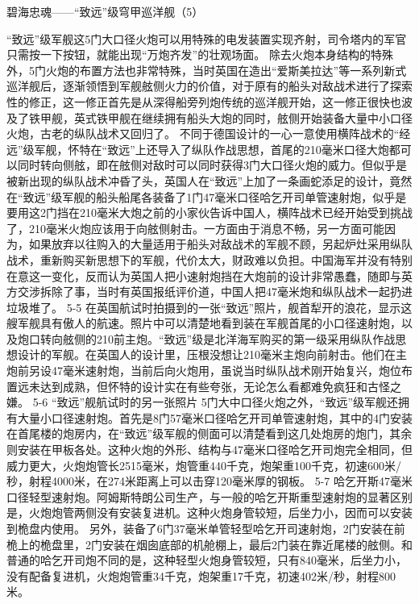 \documentclass[12pt,UTF8]{ctexbook}
\begin{document}
碧海忠魂——“致远”级穹甲巡洋舰（5）

“致远”级军舰这5门大口径火炮可以用特殊的电发装置实现齐射，司令塔内的军官只需按一下按钮，就能出现“万炮齐发”的壮观场面。 除去火炮本身结构的特殊外，5门火炮的布置方法也非常特殊，当时英国在造出“爱斯美拉达”等一系列新式巡洋舰后，逐渐领悟到军舰舷侧火力的价值，对于原有的船头对敌战术进行了探索性的修正，这一修正首先是从深得船旁列炮传统的巡洋舰开始，这一修正很快也波及了铁甲舰，英式铁甲舰在继续拥有船头大炮的同时，舷侧开始装备大量中小口径火炮，古老的纵队战术又回归了。
不同于德国设计的一心一意使用横阵战术的“经远”级军舰，怀特在“致远”上还导入了纵队作战思想，首尾的210毫米口径大炮都可以同时转向侧舷，即在舷侧对敌时可以同时获得3门大口径火炮的威力。但似乎是被新出现的纵队战术冲昏了头，英国人在“致远”上加了一条画蛇添足的设计，竟然在“致远”级军舰的船头船尾各装备了1门47毫米口径哈乞开司单管速射炮，似乎是要用这2门挡在210毫米大炮之前的小家伙告诉中国人，横阵战术已经开始受到挑战了，210毫米火炮应该用于向舷侧射击。一方面由于消息不畅，另一方面可能因为，如果放弃以往购入的大量适用于船头对敌战术的军舰不顾，另起炉灶采用纵队战术，重新购买新思想下的军舰，代价太大，财政难以负担。中国海军并没有特别在意这一变化，反而认为英国人把小速射炮挡在大炮前的设计非常愚蠢，随即与英方交涉拆除了事，当时有英国报纸评价道，中国人把47毫米炮和纵队战术一起扔进垃圾堆了。
5-5
在英国航试时拍摄到的一张“致远”照片，舰首犁开的浪花，显示这艘军舰具有傲人的航速。照片中可以清楚地看到装在军舰首尾的小口径速射炮，以及炮口转向舷侧的210前主炮。“致远”级是北洋海军购买的第一级采用纵队作战思想设计的军舰。在英国人的设计里，压根没想让210毫米主炮向前射击。他们在主炮前另设47毫米速射炮，当前后向火炮用，虽说当时纵队战术刚开始复兴，炮位布置远未达到成熟，但怀特的设计实在有些夸张，无论怎么看都难免疯狂和古怪之嫌。
5-6 “致远”舰航试时的另一张照片
5门大中口径火炮之外，“致远”级军舰还拥有大量小口径速射炮。首先是8门57毫米口径哈乞开司单管速射炮，其中的4门安装在首尾楼的炮房内，在“致远”级军舰的侧面可以清楚看到这几处炮房的炮门，其余则安装在甲板各处。这种火炮的外形、结构与47毫米口径哈乞开司炮完全相同，但威力更大，火炮炮管长2515毫米，炮管重440千克，炮架重100千克，初速600米/秒，射程4000米，在274米距离上可以击穿120毫米厚的钢板。
5-7
哈乞开斯47毫米口径轻型速射炮。阿姆斯特朗公司生产，与一般的哈乞开斯重型速射炮的显著区别是，火炮炮管两侧没有安装复进机。这种火炮身管较短，后坐力小，因而可以安装到桅盘内使用。
另外，装备了6门37毫米单管轻型哈乞开司速射炮，2门安装在前桅上的桅盘里，2门安装在烟囱底部的机舱棚上，最后2门装在靠近尾楼的舷侧。和普通的哈乞开司炮不同的是，这种轻型火炮身管较短，只有840毫米，后坐力小，没有配备复进机，火炮炮管重34千克，炮架重17千克，初速402米/秒，射程800米。
\end{document}
